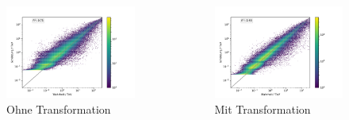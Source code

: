 \documentclass[aspectratio=1610, professionalfonts, 9pt]{beamer}
\begin{document}
  \begin{frame}
    \begin{columns}
      \begin{figure}
        \includegraphics[width=1.1\textwidth]{pictures/RF_encaps.pdf}
        \caption{Ohne Transformation}
        \label{}
      \end{figure}
      \begin{figure}
        \includegraphics[width=1.1\textwidth]{pictures/trafo_encaps.pdf}
        \caption{Mit Transformation}
        \label{}
      \end{figure}
    \end{columns}
  \end{frame}
\end{document}
